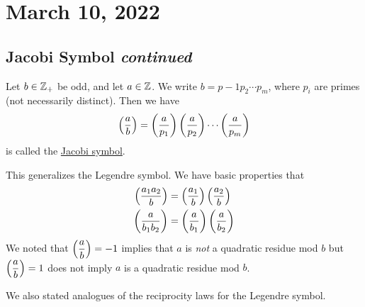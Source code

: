 \section{March 10, 2022}
\subsection{Jacobi Symbol \emph{continued}}
\recall
\begin{definition*}
    Let $b\in\mathbb Z_+$ be odd, and let $a\in\mathbb Z$. We write $b = p-1p_2\cdots p_m$, where $p_i$ are primes (not necessarily distinct). Then we have
    \[\left(\dfrac{a}{b}\right) = \left(\dfrac{a}{p_1}\right)\left(\dfrac{a}{p_2}\right)\cdots \left(\dfrac{a}{p_m}\right)\]
    is called the \ul{Jacobi symbol}.
\end{definition*}

This generalizes the Legendre symbol. We have basic properties that
\begin{align*}
    \left(\dfrac{a_1a_2}{b}\right) & = \left(\dfrac{a_1}{b}\right)\left(\dfrac{a_2}{b}\right) \\
    \left(\dfrac{a}{b_1b_2}\right) & = \left(\dfrac{a}{b_1}\right)\left(\dfrac{a}{b_2}\right)
\end{align*}
We noted that $\left(\dfrac{a}{b}\right) = -1$ implies that $a$ is \emph{not} a quadratic residue mod $b$ but $\left(\dfrac{a}{b}\right) = 1$ does not imply $a$ is a quadratic residue mod $b$.

We also stated analogues of the reciprocity laws for the Legendre symbol.

